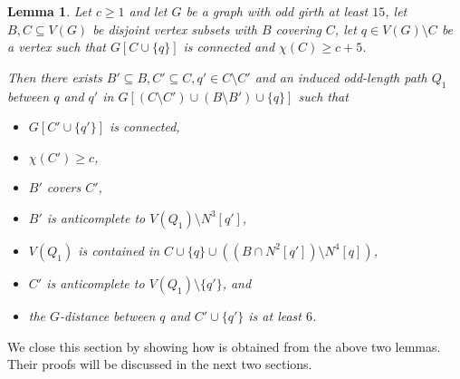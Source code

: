 \documentclass{article}
\newtheorem{lemma}[theorem]{Lemma}
\begin{document}
\begin{lemma}\label{lemma:construction_quasi}
    Let $c \geq 1$ and let $G$ be a graph with odd girth at least $15$, let $B, C \subseteq V(G)$ be disjoint vertex subsets with $B$ covering $C$, let $q \in V(G) \setminus C$ be a vertex such that $G[C \cup \{q\}]$ is connected and $\chi(C)\geq c+5$.

    Then there exists $B' \subseteq B, C' \subseteq C, q' \in C \setminus C'$ and an induced odd-length path $Q_1$ between $q$ and $q'$ in $G[(C \setminus C') \cup (B \setminus B') \cup \{q\}]$ such that 

    \begin{itemize}
        \item $G[C' \cup \{q'\}]$ is connected,
        \item $\chi(C') \geq c$, 
        \item $B'$ covers $C'$,
        \item $B'$ is anticomplete to $V(Q_1) \setminus N^3[q']$,
        \item $V(Q_1)$ is contained in $C \cup \{q\} \cup ((B \cap N^2[q']) \setminus N^4[q])$,
        \item $C'$ is anticomplete to $V(Q_1) \setminus \{q'\}$, and
        \item the $G$-distance between $q$ and $C' \cup \{q'\}$ is at least $6$.
    \end{itemize}
\end{lemma}

We close this section by showing how  is obtained from the above two lemmas.
Their proofs will be discussed in the next two sections.
\end{document}
